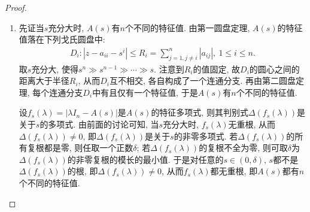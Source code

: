 \documentclass[../../main.tex]{subfiles}%
\begin{document}
\begin{proof}
\begin{enumerate}[(1)]
\item 先证当\(s\)充分大时, \(A(s)\)有\(n\)个不同的特征值. 由第一圆盘定理, \(A(s)\)的特征值落在下列戈氏圆盘中:
\begin{align*}
D_{i}:|z - a_{ii}-s^{i}| \leqslant  R_{i}=\sum_{j = 1,j\neq i}^{n}|a_{ij}|,\ 1 \leqslant  i \leqslant  n.
\end{align*}
取\(s\)充分大, 使得\(s^{n} \gg s^{n - 1} \gg \cdots \gg s\). 注意到\(R_{i}\)的值固定, 故\(D_{i}\)的圆心之间的距离大于半径\(R_{i}\), 从而\(D_{i}\)互不相交, 各自构成了一个连通分支. 再由第二圆盘定理, 每个连通分支\(D_{i}\)中有且仅有一个特征值, 于是\(A(s)\)有\(n\)个不同的特征值.

设\(f_{s}(\lambda)=|\lambda I_{n}-A(s)|\)是\(A(s)\)的特征多项式, 则其判别式\(\Delta(f_{s}(\lambda))\)是关于\(s\)的多项式. 由前面的讨论可知, 当\(s\)充分大时, \(f_{s}(\lambda)\)无重根, 从而\(\Delta(f_{s}(\lambda)) \neq 0\), 即\(\Delta(f_{s}(\lambda))\)是关于\(s\)的非零多项式. 若\(\Delta(f_{s}(\lambda))\)的所有复根都是零, 则任取一个正数\(\delta\); 若\(\Delta(f_{s}(\lambda))\)的复根不全为零, 则可取\(\delta\)为\(\Delta(f_{s}(\lambda))\)的非零复根的模长的最小值. 于是对任意的\(s \in (0,\delta)\), \(s\)都不是\(\Delta(f_{s}(\lambda))\)的根, 即\(\Delta(f_{s}(\lambda)) \neq 0\), 从而\(f_{s}(\lambda)\)都无重根, 即\(A(s)\)都有\(n\)个不同的特征值. 
\end{enumerate}
\end{proof}
\end{document}
